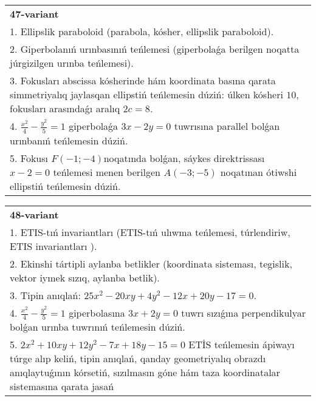 \documentclass{article}
\begin{document}
\begin{tabular}{m{17cm}}
\textbf{47-variant}\\
1. Ellipslik paraboloid (parabola, kósher, ellipslik paraboloid).\\

2. Giperbolanıń urınbasınıń teńlemesi (giperbolaǵa berilgen noqatta júrgizilgen urınba teńlemesi).\\

3. Fokusları abscissa kósherinde hám koordinata basına qarata simmetriyalıq jaylasqan ellipstiń teńlemesin dúziń: úlken kósheri $10$, fokusları arasındaǵı aralıq $2 c=8$.\\

4. $\frac{x^{2}}{4} - \frac{y^{2}}{5} = 1$ giperbolaǵa $3x - 2y = 0$ tuwrısına parallel bolǵan urınbanıń teńlemesin dúziń.  \\

5. Fokusı $F( - 1; - 4)$noqatında bolǵan, sáykes direktrissası $x - 2 = 0$ teńlemesi menen berilgen $A( - 3; - 5)$ noqatınan ótiwshi ellipstiń teńlemesin dúziń.  
\end{tabular}
\vspace{1cm}


\begin{tabular}{m{17cm}}
\textbf{48-variant}\\
1. ETIS-tıń invariantları (ETIS-tıń ulıwma teńlemesi, túrlendiriw, ETIS invariantları ).\\

2. Ekinshi tártipli aylanba betlikler (koordinata sisteması, tegislik, vektor iymek sızıq, aylanba betlik).\\

3. Tipin anıqlań: $25 x^{2}-20 xy+4 y^{2}-12 x+20 y-17=0$.\\

4. $\frac{x^{2}}{4} - \frac{y^{2}}{5} = 1$ giperbolasına $3x + 2y = 0$ tuwrı sızıǵına perpendikulyar bolǵan urınba tuwrınıń teńlemesin dúziń.\\

5. $2x^{2} + 10xy + 12y^{2} - 7x + 18y - 15 = 0$ ETİS teńlemesin ápiwayı túrge alıp keliń, tipin anıqlań, qanday geometriyalıq obrazdı anıqlaytuǵının kórsetiń, sızılmasın góne hám taza koordinatalar sistemasına qarata jasań  
\end{tabular}
\vspace{1cm}
\end{document}
